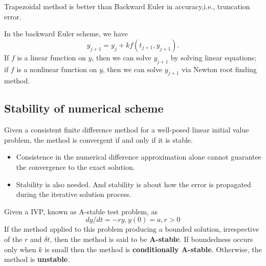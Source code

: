 \begin{refsection}
\begin{remark}
Trapezoidal method is better than Backward Euler in accuracy,i.e., truncation error.	
\end{remark}

\begin{remark}
In the backward Euler scheme, we have
$$y_{j+1} = y_j + k f(t_{j+1},y_{j+1}).$$
If $f$ is a linear function on $y$, then we can solve $y_{j+1}$ by solving linear equations; if $f$ is a nonlinear function on $y$, then we can solve $y_{j+1}$ via Newton root finding method.
\end{remark}


\FloatBarrier
\subsection{Stability of numerical scheme}

\begin{theorem}\cite[32]{strikwerda2004finite}
Given a consistent finite difference method for a well-posed linear initial value problem, the method is convergent if and only if it is stable.	
\end{theorem}



\begin{remark}\hfill
\begin{itemize}
    \item Consistence in the numerical difference approximation alone cannot guarantee the convergence to the exact solution.
    \item Stability is also needed. And stability is about how the error is propagated during the iterative solution process.
\end{itemize}
\end{remark}

\begin{definition}[A-stable]\cite[13]{holmes2007introduction}
Given a IVP, known as A-stable test problem, as
$$dy/dt = -ry,y(0) = a,r>0$$
If the method applied to this problem producing a bounded solution, irrespective of the $r$ and $\delta t$, then the method is said to be \textbf{A-stable}. If boundedness occurs only when $k$ is small then the method is \textbf{conditionally A-stable}. Otherwise, the method is \textbf{unstable}.
\end{definition}



\end{refsection}
